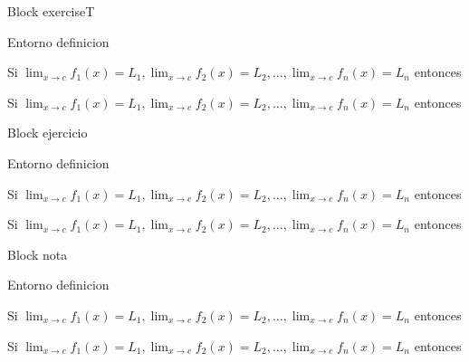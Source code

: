 \documentclass[]{beamer}
\theoremstyle{plain}
\begin{document}
\begin{frame}[fragile]{Block exerciseT}
\begin{source}{Entorno definicion}{}
\begin{exerciseT}
 Si \hspace{5pt}$\displaystyle \lim_{x\rightarrow c}f_1(x)=L_1, \displaystyle \lim_{x\rightarrow c}f_2(x)=L_2,\dots, \displaystyle \lim_{x\rightarrow c}f_n(x)=L_n $
 entonces
\end{exerciseT}
\end{source}
\begin{exerciseT}
 Si \hspace{5pt}$\displaystyle \lim_{x\rightarrow c}f_1(x)=L_1, \displaystyle \lim_{x\rightarrow c}f_2(x)=L_2,\dots, \displaystyle \lim_{x\rightarrow c}f_n(x)=L_n $
 entonces
\end{exerciseT}
\end{frame}
\begin{frame}[fragile]{Block ejercicio}
\begin{source}{Entorno definicion}{}
\begin{ejercicio}
 Si \hspace{5pt}$\displaystyle \lim_{x\rightarrow c}f_1(x)=L_1, \displaystyle \lim_{x\rightarrow c}f_2(x)=L_2,\dots, \displaystyle \lim_{x\rightarrow c}f_n(x)=L_n $
 entonces
\end{ejercicio}
\end{source}
\begin{ejercicio}
 Si \hspace{5pt}$\displaystyle \lim_{x\rightarrow c}f_1(x)=L_1, \displaystyle \lim_{x\rightarrow c}f_2(x)=L_2,\dots, \displaystyle \lim_{x\rightarrow c}f_n(x)=L_n $
 entonces
\end{ejercicio}
\end{frame}
\begin{frame}[fragile]{Block nota}
\begin{source}{Entorno definicion}{}
\begin{nota}
 Si \hspace{5pt}$\displaystyle \lim_{x\rightarrow c}f_1(x)=L_1, \displaystyle \lim_{x\rightarrow c}f_2(x)=L_2,\dots, \displaystyle \lim_{x\rightarrow c}f_n(x)=L_n $
 entonces
\end{nota}
\end{source}
\begin{nota}
 Si \hspace{5pt}$\displaystyle \lim_{x\rightarrow c}f_1(x)=L_1, \displaystyle \lim_{x\rightarrow c}f_2(x)=L_2,\dots, \displaystyle \lim_{x\rightarrow c}f_n(x)=L_n $
 entonces
\end{nota}
\end{frame}
\end{document}

